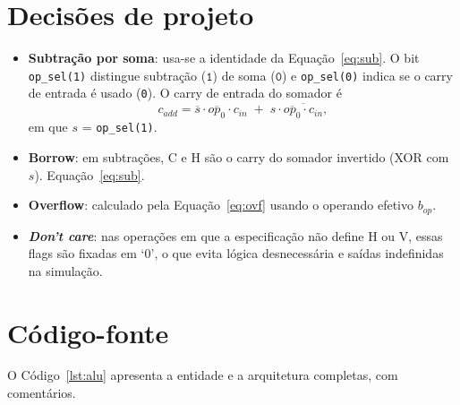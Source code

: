 \newpage
\section{Decisões de projeto}

\begin{itemize}
  \item \textbf{Subtração por soma}: usa-se a identidade da Equação~\ref{eq:sub}. O bit \texttt{op\_sel(1)} distingue subtração ($\texttt{1}$) de soma ($\texttt{0}$) e \texttt{op\_sel(0)} indica se o carry de entrada é usado (\texttt{0}). O carry de entrada do somador é
  \[
    c_{add} = \overline{s}\cdot\overline{op_0}\cdot c_{in} \;+\; s\cdot\overline{\overline{op_0}\cdot c_{in}},
  \]
  em que $s$ = \texttt{op\_sel(1)}.
  \item \textbf{Borrow}: em subtrações, C e H são o carry do somador invertido (XOR com $s$). Equação~\ref{eq:sub}.
  \item \textbf{Overflow}: calculado pela Equação~\ref{eq:ovf} usando o operando efetivo $b_{op}$.
  \item \textbf{\textit{Don't care}}: nas operações em que a especificação não define H ou V, essas flags são fixadas em `0', o que evita lógica desnecessária e saídas indefinidas na simulação.
\end{itemize}

\section{Código-fonte}

O Código~\ref{lst:alu} apresenta a entidade e a arquitetura completas, com comentários.


\vspace{-0.3cm}
